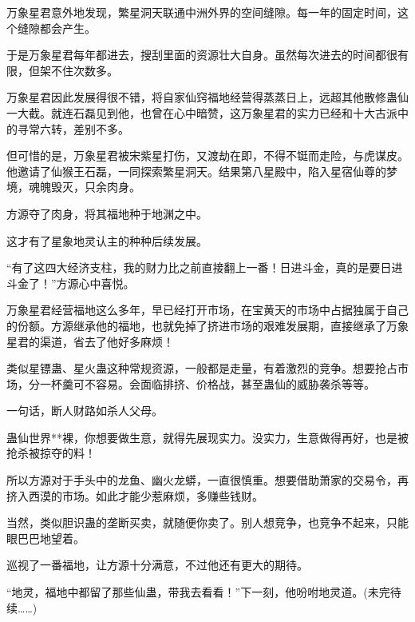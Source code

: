 \begin{this_body}
万象星君意外地发现，繁星洞天联通中洲外界的空间缝隙。每一年的固定时间，这个缝隙都会产生。

于是万象星君每年都进去，搜刮里面的资源壮大自身。虽然每次进去的时间都很有限，但架不住次数多。

万象星君因此发展得很不错，将自家仙窍福地经营得蒸蒸日上，远超其他散修蛊仙一大截。就连石磊见到他，也曾在心中暗赞，这万象星君的实力已经和十大古派中的寻常六转，差别不多。

但可惜的是，万象星君被宋紫星打伤，又渡劫在即，不得不铤而走险，与虎谋皮。他邀请了仙猴王石磊，一同探索繁星洞天。结果第八星殿中，陷入星宿仙尊的梦境，魂魄毁灭，只余肉身。

方源夺了肉身，将其福地种于地渊之中。

这才有了星象地灵认主的种种后续发展。

“有了这四大经济支柱，我的财力比之前直接翻上一番！日进斗金，真的是要日进斗金了！”方源心中喜悦。

万象星君经营福地这么多年，早已经打开市场，在宝黄天的市场中占据独属于自己的份额。方源继承他的福地，也就免掉了挤进市场的艰难发展期，直接继承了万象星君的渠道，省去了他好多麻烦！

类似星镖蛊、星火蛊这种常规资源，一般都是走量，有着激烈的竞争。想要抢占市场，分一杯羹可不容易。会面临排挤、价格战，甚至蛊仙的威胁袭杀等等。

一句话，断人财路如杀人父母。

蛊仙世界**裸，你想要做生意，就得先展现实力。没实力，生意做得再好，也是被抢杀被掠夺的料！

所以方源对于手头中的龙鱼、幽火龙蟒，一直很慎重。想要借助萧家的交易令，再挤入西漠的市场。如此才能少惹麻烦，多赚些钱财。

当然，类似胆识蛊的垄断买卖，就随便你卖了。别人想竞争，也竞争不起来，只能眼巴巴地望着。

巡视了一番福地，让方源十分满意，不过他还有更大的期待。

“地灵，福地中都留了那些仙蛊，带我去看看！”下一刻，他吩咐地灵道。(未完待续……)

\end{this_body}

